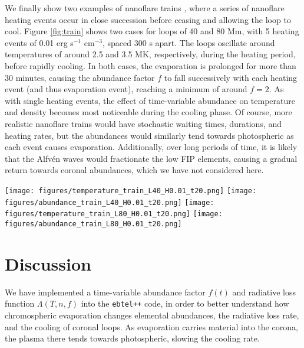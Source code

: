 \documentclass[twocolumn]{aastex631}
\begin{document}
We finally show two examples of nanoflare trains \citep{reep2013,cargill2014,barnes2016b}, where a series of nanoflare heating events occur in close succession before ceasing and allowing the loop to cool.  Figure \ref{fig:train} shows two cases for loops of 40 and 80 Mm, with 5 heating events of 0.01 erg s$^{-1}$ cm$^{-3}$, spaced 300 s apart.  The loops oscillate around temperatures of around 2.5 and 3.5 MK, respectively, during the heating period, before rapidly cooling.  In both cases, the evaporation is prolonged for more than 30 minutes, causing the abundance factor $f$ to fall successively with each heating event (and thus evaporation event), reaching a minimum of around $f=2$.  As with single heating events, the effect of time-variable abundance on temperature and density becomes most noticeable during the cooling phase.  Of course, more realistic nanoflare trains would have stochastic waiting times, durations, and heating rates, but the abundances would similarly tend towards photospheric as each event causes evaporation.  Additionally, over long periods of time, it is likely that the Alfv\'en waves would fractionate the low FIP elements, causing a gradual return towards coronal abundances, which we have not considered here.  
\begin{figure*}
    \centering
    \texttt{[image: figures/temperature\_train\_L40\_H0.01\_t20.png]}
    \texttt{[image: figures/abundance\_train\_L40\_H0.01\_t20.png]}
    \texttt{[image: figures/temperature\_train\_L80\_H0.01\_t20.png]}
    \texttt{[image: figures/abundance\_train\_L80\_H0.01\_t20.png]}
    \caption{Two examples of nanoflare trains, with 5 heating events spaced 300 s apart, for loops of 40 and 80 Mm.  The abundance factor $f$ falls with each successive heating event. \label{fig:train}}
\end{figure*}

\section{Discussion}

We have implemented a time-variable abundance factor $f(t)$ and radiative loss function $\Lambda(T, n, f)$ into the \texttt{ebtel++} code, in order to better understand how chromospheric evaporation changes elemental abundances, the radiative loss rate, and the cooling of coronal loops.  As evaporation carries material into the corona, the plasma there tends towards photospheric, slowing the cooling rate.  
\end{document}
